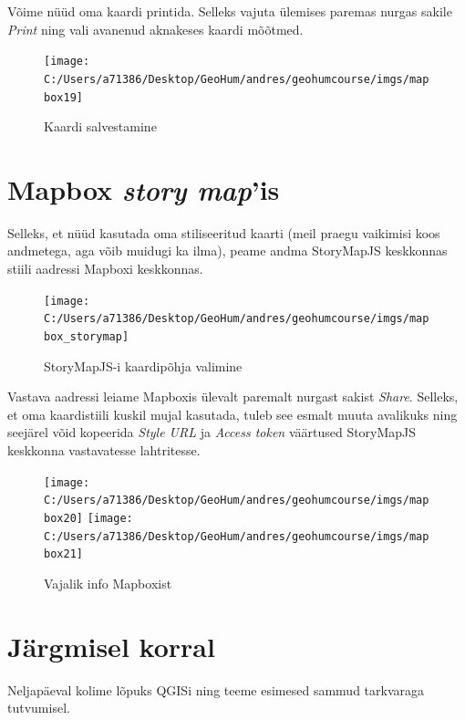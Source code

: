 \documentclass[
]{book}
\begin{document}
Võime nüüd oma kaardi printida. Selleks vajuta ülemises paremas nurgas sakile \emph{Print} ning vali avanenud aknakeses kaardi mõõtmed.

\begin{figure}
\texttt{[image: C:/Users/a71386/Desktop/GeoHum/andres/geohumcourse/imgs/mapbox19]} \caption{Kaardi salvestamine}\label{fig:mapbox12}
\end{figure}

\hypertarget{mapbox-story-mapis}{%
\section{\texorpdfstring{Mapbox \emph{story map}'is}{Mapbox story map'is}}\label{mapbox-story-mapis}}

Selleks, et nüüd kasutada oma stiliseeritud kaarti (meil praegu vaikimisi koos andmetega, aga võib muidugi ka ilma), peame andma StoryMapJS keskkonnas stiili aadressi Mapboxi keskkonnas.

\begin{figure}
\texttt{[image: C:/Users/a71386/Desktop/GeoHum/andres/geohumcourse/imgs/mapbox\_storymap]} \caption{StoryMapJS-i kaardipõhja valimine}\label{fig:mapboxstorymap1}
\end{figure}

Vastava aadressi leiame Mapboxis ülevalt paremalt nurgast sakist \emph{Share}. Selleks, et oma kaardistiili kuskil mujal kasutada, tuleb see esmalt muuta avalikuks ning seejärel võid kopeerida \emph{Style URL} ja \emph{Access token} väärtused StoryMapJS keskkonna vastavatesse lahtritesse.

\begin{figure}
\texttt{[image: C:/Users/a71386/Desktop/GeoHum/andres/geohumcourse/imgs/mapbox20]} \texttt{[image: C:/Users/a71386/Desktop/GeoHum/andres/geohumcourse/imgs/mapbox21]} \caption{Vajalik info Mapboxist}\label{fig:mapboxstorymap2}
\end{figure}

\hypertarget{juxe4rgmisel-korral-3}{%
\section{Järgmisel korral}\label{juxe4rgmisel-korral-3}}

Neljapäeval kolime lõpuks QGISi ning teeme esimesed sammud tarkvaraga tutvumisel.

  
\end{document}
